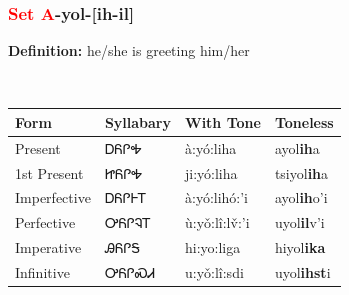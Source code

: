 \subsubsection*{\textcolor{Red}{Set A}{-}\textbf{yol}{-}[ih-il]}
\nopagebreak
\textbf{Definition: } he/she is greeting him/her
\\[0.5em]
\begin{tabularx}{\textwidth}{l X X X}%
\toprule%
\textbf{Form}&\textbf{Syllabary}&\textbf{With Tone}&\textbf{Toneless}\\%
\midrule%
Present&ᎠᏲᎵᎭ&à:yó:liha&ayol\textbf{ih}a\\%
1st Present&ᏥᏲᎵᎭ&ji:yó:liha&tsiyol\textbf{ih}a\\%
Imperfective&ᎠᏲᎵᎰᎢ&à:yó:lihó:’i&ayol\textbf{ih}o'i\\%
Perfective&ᎤᏲᎵᎸᎢ&ù:yǒ:lî:lv̌:’i&uyol\textbf{il}v'i\\%
Imperative&ᎯᏲᎵᎦ&hi:yo:liga&hiyol\textbf{ika}\\%
Infinitive&ᎤᏲᎵᏍᏗ&u:yǒ:lî:sdi&uyol\textbf{ihst}i\\%
\bottomrule%
\end{tabularx}
\\[1em]
